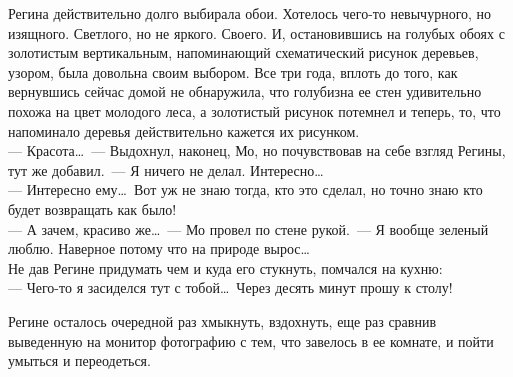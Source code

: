 Регина действительно долго выбирала обои. Хотелось чего-то невычурного, но 
изящного. Светлого, но не яркого. Своего. И, остановившись на голубых обоях с 
золотистым вертикальным, напоминающий схематический рисунок деревьев, узором, 
была довольна своим выбором. Все три года, вплоть до того, как вернувшись 
сейчас 
домой не обнаружила, что голубизна ее стен удивительно похожа на цвет молодого 
леса, а золотистый рисунок потемнел и теперь, то, что напоминало деревья 
действительно кажется их рисунком.\\
--- Красота\ldots~--- Выдохнул, наконец, Мо, но почувствовав на себе взгляд 
Регины, тут же добавил.~--- Я ничего не делал. Интересно\ldots\\
--- Интересно ему\ldots\ Вот уж не знаю тогда, кто это сделал, но точно знаю 
кто будет возвращать как было!\\
--- А зачем, красиво же\ldots~--- Мо провел по стене рукой.~--- Я вообще 
зеленый люблю. Наверное потому что на природе вырос\ldots\\
Не дав Регине придумать чем и куда его стукнуть, помчался на кухню:\\
--- Чего-то я засиделся тут с тобой\ldots\ Через десять минут прошу к столу!

Регине осталось очередной раз хмыкнуть, вздохнуть, еще раз сравнив выведенную 
на 
монитор фотографию с тем, что завелось в ее комнате, и пойти умыться и 
переодеться.

